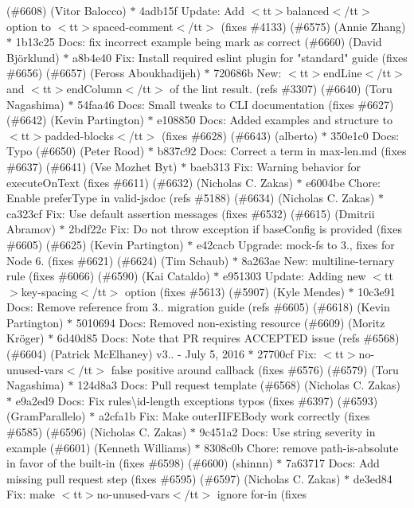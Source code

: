 \begin{DoxyItemize}
(\#6608) (\+Vitor Balocco) \texorpdfstring{$\ast$}{*} 4adb15f Update\+: Add $<$tt$>$balanced$<$/tt$>$ option to $<$tt$>$spaced-\/comment$<$/tt$>$ (fixes \#4133) (\#6575) (\+Annie Zhang) \texorpdfstring{$\ast$}{*} 1b13c25 Docs\+: fix incorrect example being mark as correct (\#6660) (\+David Björklund) \texorpdfstring{$\ast$}{*} a8b4e40 Fix\+: Install required eslint plugin for "{}standard"{} guide (fixes \#6656) (\#6657) (\+Feross Aboukhadijeh) \texorpdfstring{$\ast$}{*} 720686b New\+: $<$tt$>$end\+Line$<$/tt$>$ and $<$tt$>$end\+Column$<$/tt$>$ of the lint result. (refs \#3307) (\#6640) (\+Toru Nagashima) \texorpdfstring{$\ast$}{*} 54faa46 Docs\+: Small tweaks to CLI documentation (fixes \#6627) (\#6642) (\+Kevin Partington) \texorpdfstring{$\ast$}{*} e108850 Docs\+: Added examples and structure to $<$tt$>$padded-\/blocks$<$/tt$>$ (fixes \#6628) (\#6643) (alberto) \texorpdfstring{$\ast$}{*} 350e1c0 Docs\+: Typo (\#6650) (\+Peter Rood) \texorpdfstring{$\ast$}{*} b837c92 Docs\+: Correct a term in max-\/len.\+md (fixes \#6637) (\#6641) (\+Vse Mozhet Byt) \texorpdfstring{$\ast$}{*} baeb313 Fix\+: Warning behavior for execute\+On\+Text (fixes \#6611) (\#6632) (\+Nicholas C. Zakas) \texorpdfstring{$\ast$}{*} e6004be Chore\+: Enable prefer\+Type in valid-\/jsdoc (refs \#5188) (\#6634) (\+Nicholas C. Zakas) \texorpdfstring{$\ast$}{*} ca323cf Fix\+: Use default assertion messages (fixes \#6532) (\#6615) (\+Dmitrii Abramov) \texorpdfstring{$\ast$}{*} 2bdf22c Fix\+: Do not throw exception if base\+Config is provided (fixes \#6605) (\#6625) (\+Kevin Partington) \texorpdfstring{$\ast$}{*} e42cacb Upgrade\+: mock-\/fs to 3., fixes for Node 6. (fixes \#6621) (\#6624) (\+Tim Schaub) \texorpdfstring{$\ast$}{*} 8a263ae New\+: multiline-\/ternary rule (fixes \#6066) (\#6590) (\+Kai Cataldo) \texorpdfstring{$\ast$}{*} e951303 Update\+: Adding new $<$tt$>$key-\/spacing$<$/tt$>$ option (fixes \#5613) (\#5907) (\+Kyle Mendes) \texorpdfstring{$\ast$}{*} 10c3e91 Docs\+: Remove reference from 3.. migration guide (refs \#6605) (\#6618) (\+Kevin Partington) \texorpdfstring{$\ast$}{*} 5010694 Docs\+: Removed non-\/existing resource (\#6609) (\+Moritz Kröger) \texorpdfstring{$\ast$}{*} 6d40d85 Docs\+: Note that PR requires ACCEPTED issue (refs \#6568) (\#6604) (\+Patrick Mc\+Elhaney)  v3.. -\/ July 5, 2016  \texorpdfstring{$\ast$}{*} 27700cf Fix\+: $<$tt$>$no-\/unused-\/vars$<$/tt$>$ false positive around callback (fixes \#6576) (\#6579) (\+Toru Nagashima) \texorpdfstring{$\ast$}{*} 124d8a3 Docs\+: Pull request template (\#6568) (\+Nicholas C. Zakas) \texorpdfstring{$\ast$}{*} e9a2ed9 Docs\+: Fix rules\textbackslash{}id-\/length exceptions typos (fixes \#6397) (\#6593) (\+Gram\+Parallelo) \texorpdfstring{$\ast$}{*} a2cfa1b Fix\+: Make outer\+IIFEBody work correctly (fixes \#6585) (\#6596) (\+Nicholas C. Zakas) \texorpdfstring{$\ast$}{*} 9c451a2 Docs\+: Use string severity in example (\#6601) (\+Kenneth Williams) \texorpdfstring{$\ast$}{*} 8308c0b Chore\+: remove path-\/is-\/absolute in favor of the built-\/in (fixes \#6598) (\#6600) (shinnn) \texorpdfstring{$\ast$}{*} 7a63717 Docs\+: Add missing pull request step (fixes \#6595) (\#6597) (\+Nicholas C. Zakas) \texorpdfstring{$\ast$}{*} de3ed84 Fix\+: make $<$tt$>$no-\/unused-\/vars$<$/tt$>$ ignore for-\/in (fixes 
\end{DoxyItemize}
